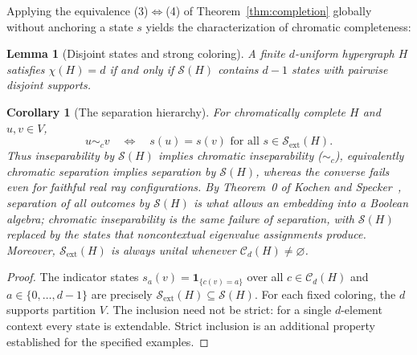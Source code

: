\documentclass[aps,pra,reprint,superscriptaddress,longbibliography,nofootinbib,floatfix,10pt]{revtex4-2}
\newtheorem{lemma}[theorem]{Lemma}
\newtheorem{corollary}[theorem]{Corollary}
\theoremstyle{definition}\newtheorem{definition}[theorem]{Definition}
\theoremstyle{remark}\newtheorem{remark}[theorem]{Remark}
\newcommand{\Sc}{\mathcal S}\newcommand{\Cc}{\mathcal C}
\begin{document}
Applying the equivalence (3)$\iff$(4) of Theorem~\ref{thm:completion} globally without anchoring a state $s$ yields the characterization of chromatic completeness:

\begin{lemma}[Disjoint states and strong coloring]\label{lem:disjoint-states}
A finite $d$-uniform hypergraph $H$ satisfies $\chi(H)=d$ if and only if $\Sc(H)$ contains $d-1$ states with pairwise disjoint supports.
\end{lemma}

\begin{corollary}[The separation hierarchy]\label{cor:hierarchy}
For chromatically complete $H$ and $u,v\in V$,
\begin{equation}\label{eq:kernel}
u\sim_c v \quad\Longleftrightarrow\quad s(u)=s(v)\text{ for all }s\in\Sc_{\mathrm{ext}}(H).
\end{equation}
Thus inseparability by $\Sc(H)$ implies chromatic inseparability ($\sim_c$), equivalently chromatic separation implies separation by $\Sc(H)$, whereas the converse fails even for faithful real ray configurations. By Theorem~0 of Kochen and Specker~\cite{kochen1}, separation of all outcomes by $\Sc(H)$ is what allows an embedding into a Boolean algebra; chromatic inseparability is the same failure of separation, with $\Sc(H)$ replaced by the states that noncontextual eigenvalue assignments produce. Moreover, $\Sc_{\mathrm{ext}}(H)$ is always unital whenever $\Cc_d(H)\ne\varnothing$.
\end{corollary}
\begin{proof}
The indicator states $s_a(v)=\mathbf 1_{\{c(v)=a\}}$ over all $c\in\Cc_d(H)$ and $a\in\{0,\ldots,d-1\}$ are precisely $\Sc_{\mathrm{ext}}(H)\subseteq\Sc(H)$. For each fixed coloring, the $d$ supports partition $V$. The inclusion need not be strict: for a single $d$-element context every state is extendable. Strict inclusion is an additional property established for the specified examples.
\end{proof}
\end{document}
